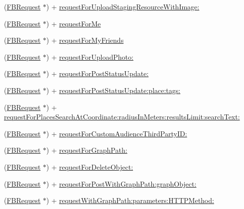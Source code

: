 \begin{DoxyCompactItemize}
\item 
(\hyperlink{interfaceFBRequest}{F\+B\+Request} $\ast$) + \hyperlink{interfaceFBRequest_a4a85038bef70a9edd91a56ab0db0bfd6}{request\+For\+Upload\+Staging\+Resource\+With\+Image\+:}
\item 
(\hyperlink{interfaceFBRequest}{F\+B\+Request} $\ast$) + \hyperlink{interfaceFBRequest_a1a8fb083c2d09cbbc5ae9afd33e2381f}{request\+For\+Me}
\item 
(\hyperlink{interfaceFBRequest}{F\+B\+Request} $\ast$) + \hyperlink{interfaceFBRequest_a95570ea8628f71b3c311da8378729cc6}{request\+For\+My\+Friends}
\item 
(\hyperlink{interfaceFBRequest}{F\+B\+Request} $\ast$) + \hyperlink{interfaceFBRequest_a871fdb57a3c9907a5d2b788ca442c586}{request\+For\+Upload\+Photo\+:}
\item 
(\hyperlink{interfaceFBRequest}{F\+B\+Request} $\ast$) + \hyperlink{interfaceFBRequest_a0a745a53f4764835bd0945bd66fe10fd}{request\+For\+Post\+Status\+Update\+:}
\item 
(\hyperlink{interfaceFBRequest}{F\+B\+Request} $\ast$) + \hyperlink{interfaceFBRequest_a5560f9786dcf54ca907153c611f991ed}{request\+For\+Post\+Status\+Update\+:place\+:tags\+:}
\item 
(\hyperlink{interfaceFBRequest}{F\+B\+Request} $\ast$) + \hyperlink{interfaceFBRequest_a1965c2185e0d9c98e19d0edd20180ab8}{request\+For\+Places\+Search\+At\+Coordinate\+:radius\+In\+Meters\+:results\+Limit\+:search\+Text\+:}
\item 
(\hyperlink{interfaceFBRequest}{F\+B\+Request} $\ast$) + \hyperlink{interfaceFBRequest_a17f11f5dad042b4109b3a001300d6916}{request\+For\+Custom\+Audience\+Third\+Party\+I\+D\+:}
\item 
(\hyperlink{interfaceFBRequest}{F\+B\+Request} $\ast$) + \hyperlink{interfaceFBRequest_a33356f35896b2f50d96ed24c8ddf5841}{request\+For\+Graph\+Path\+:}
\item 
(\hyperlink{interfaceFBRequest}{F\+B\+Request} $\ast$) + \hyperlink{interfaceFBRequest_a6d457b796765de6b436e5ff6cf11cc44}{request\+For\+Delete\+Object\+:}
\item 
(\hyperlink{interfaceFBRequest}{F\+B\+Request} $\ast$) + \hyperlink{interfaceFBRequest_ac3f506dd49d0757265f44b41c9579c8b}{request\+For\+Post\+With\+Graph\+Path\+:graph\+Object\+:}
\item 
(\hyperlink{interfaceFBRequest}{F\+B\+Request} $\ast$) + \hyperlink{interfaceFBRequest_a2e3ee15f72f7e3380495fcf1660154ce}{request\+With\+Graph\+Path\+:parameters\+:\+H\+T\+T\+P\+Method\+:}

\end{DoxyCompactItemize}

